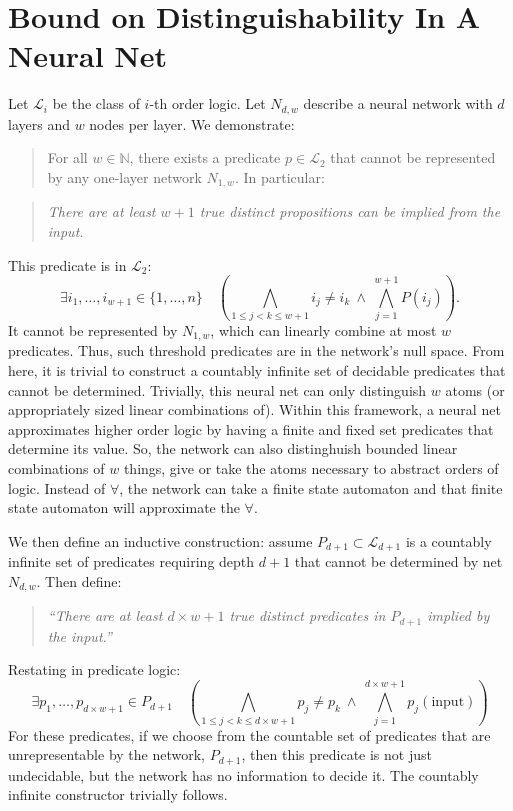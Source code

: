 \documentclass[12pt]{article}
\theoremstyle{plain}
\begin{document}
\section{Bound on Distinguishability In A Neural Net}
Let $\mathcal{L}_i$ be the class of $i$-th order logic. Let $N_{d,w}$ 
describe a neural network with $d$ layers and $w$ nodes per layer. We 
demonstrate:

\begin{quote}
For all $w \in \mathbb{N}$, there exists a predicate $p \in \mathcal{L}_2$ 
that cannot be represented by any one-layer network $N_{1,w}$. In particular:
\end{quote}
\begin{quote}
\emph{There are at least $w+1$ true distinct propositions can be implied from the input.}
\end{quote}

This predicate is in $\mathcal{L}_2$: 
$$
    \exists i_1, \dots, i_{w+1} \in \{1, \dots, n\} \quad
    \left(
    \bigwedge_{1 \leq j < k \leq w+1} i_j \neq i_k \ \wedge\
    \bigwedge_{j=1}^{w+1} P(i_j)
    \right).
$$
It cannot be represented by $N_{1,w}$, which can linearly combine at most 
$w$ predicates. Thus, such threshold predicates are in the network's null 
space.  From here, it is trivial to construct a countably infinite set
of decidable predicates that cannot be determined.  Trivially, this neural
net can only distinguish $w$ atoms (or appropriately sized linear combinations
of).  Within this framework, a neural net approximates higher order logic
by having a finite and fixed set predicates that determine its value.
So, the network can also distinghuish bounded linear combinations of $w$
things, give or take the atoms necessary to abstract orders of logic.
Instead of $\forall$, the network can take a finite state automaton and
that finite state automaton will approximate the $\forall$.

We then define an inductive construction: assume $P_{d+1} \subset 
\mathcal{L}_{d+1}$ is a countably infinite set of predicates requiring depth 
$d+1$ that cannot be determined by net $N_{d,w}$. Then define:
\begin{quote}
\emph{``There are at least $d \times w + 1$ true distinct predicates in $P_{d+1}$ implied by the input.''}
\end{quote}
Restating in predicate logic:
$$
    \exists p_1, \dots, p_{d \times w + 1} \in P_{d+1} \quad
    \left(
    \bigwedge_{1 \leq j < k \leq d \times w + 1} p_j \neq p_k \ \wedge\
    \bigwedge_{j=1}^{d \times w + 1} p_j(\text{input})
    \right)
$$
For these predicates, if we choose from the countable set of predicates that
are unrepresentable by the network, $P_{d+1}$, then this predicate is not
just undecidable, but the network has no information to decide it. The
countably infinite constructor trivially follows.
\end{document}

